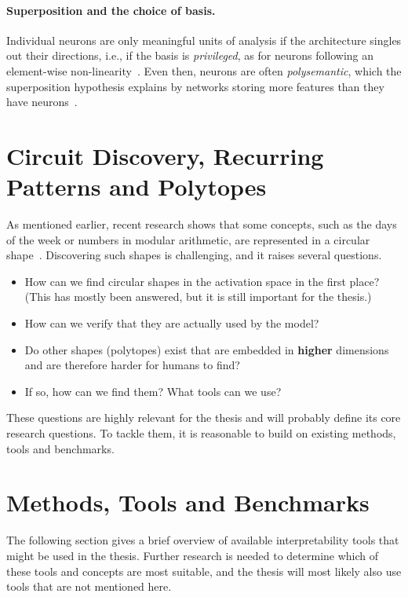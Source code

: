 \documentclass[11pt,a4paper]{article}
\begin{document}
\paragraph{Superposition and the choice of basis.}
Individual neurons are only meaningful units of analysis if the architecture
singles out their directions, i.e., if the basis is \emph{privileged}, as for
neurons following an element-wise non-linearity~\cite{elhage2022toy}. Even then,
neurons are often \emph{polysemantic}, which the superposition hypothesis explains by networks storing more
features than they have neurons~\cite{elhage2022toy,bereska2024review}.

\section{Circuit Discovery, Recurring Patterns and Polytopes}
As mentioned earlier, recent research shows that some concepts, such as the days of the week or numbers in modular arithmetic, are represented in a circular shape~\cite{engels2025notall,bereska2024review}. Discovering such shapes is challenging, and it raises several questions.


\begin{itemize}
  \item How can we find circular shapes in the activation space in the first place? (This has mostly been answered, but it is still important for the thesis.)
  \item How can we verify that they are actually used by the model?
  \item Do other shapes (polytopes) exist that are embedded in \textbf{higher} dimensions and are therefore harder for humans to find?
  \item If so, how can we find them? What tools can we use?
\end{itemize}

These questions are highly relevant for the thesis and will probably define its core research questions. To tackle them, it is reasonable to build on existing methods, tools and benchmarks.

\section{Methods, Tools and Benchmarks}
The following section gives a brief overview of available interpretability tools that might be used in the thesis. Further research is needed to determine which of these tools and concepts are most suitable, and the thesis will most likely also use tools that are not mentioned here.
\end{document}
